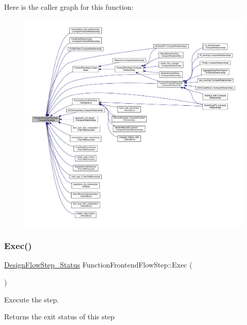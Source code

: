 Here is the caller graph for this function\+:
\nopagebreak
\begin{figure}[H]
\begin{center}
\leavevmode
\includegraphics[width=350pt]{d8/d0a/classFunctionFrontendFlowStep_afb307a4196545afa53ce35c7e4955de7_icgraph}
\end{center}
\end{figure}
\mbox{\label{classFunctionFrontendFlowStep_a4ee2aae4089ec112f2236c0b08a854bb}} 
\subsubsection{\texorpdfstring{Exec()}{Exec()}}
{\footnotesize\ttfamily \hyperlink{design__flow__step_8hpp_afb1f0d73069c26076b8d31dbc8ebecdf}{Design\+Flow\+Step\+\_\+\+Status} Function\+Frontend\+Flow\+Step\+::\+Exec (\begin{DoxyParamCaption}{ }\end{DoxyParamCaption})\hspace{0.3cm}{\ttfamily [virtual]}}



Execute the step. 

\begin{DoxyReturn}{Returns}
the exit status of this step 
\end{DoxyReturn}


